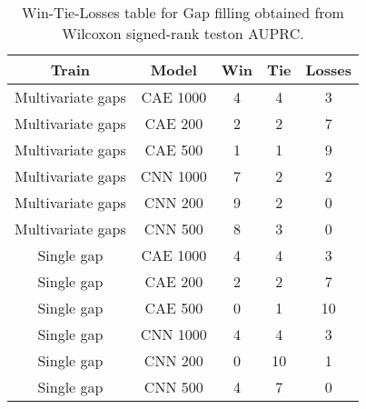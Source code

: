\begin{table}[H]
\centering
\begin{tabular}{|c|c|c|c|c|}

    \textbf{Train} & \textbf{Model} &  \textbf{Win} &  \textbf{Tie} &  \textbf{Losses} \\
\hline

 Multivariate gaps &       CAE 1000 &             4 &             4 &                3 \\
\hline
 Multivariate gaps &        CAE 200 &             2 &             2 &                7 \\
\hline
 Multivariate gaps &        CAE 500 &             1 &             1 &                9 \\
\hline
 Multivariate gaps &       CNN 1000 &             7 &             2 &                2 \\
\hline
 Multivariate gaps &        CNN 200 &             9 &             2 &                0 \\
\hline
 Multivariate gaps &        CNN 500 &             8 &             3 &                0 \\
\hline
        Single gap &       CAE 1000 &             4 &             4 &                3 \\
\hline
        Single gap &        CAE 200 &             2 &             2 &                7 \\
\hline
        Single gap &        CAE 500 &             0 &             1 &               10 \\
\hline
        Single gap &       CNN 1000 &             4 &             4 &                3 \\
\hline
        Single gap &        CNN 200 &             0 &            10 &                1 \\
\hline
        Single gap &        CNN 500 &             4 &             7 &                0 \\
\hline

\end{tabular}
\caption{Win-Tie-Losses table for Gap filling obtained from Wilcoxon signed-rank teston AUPRC.}
\label{tab:gap_filling_model_training_data_comparison}
\end{table}